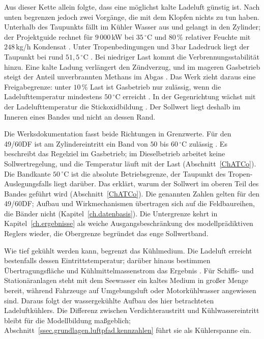 Aus dieser Kette allein folgte, dass eine möglichst kalte Ladeluft
günstig ist. Nach unten begrenzen jedoch zwei Vorgänge, die mit dem
Klopfen nichts zu tun haben. Unterhalb des Taupunkts fällt im Kühler
Wasser aus und gelangt in den Zylinder; der Projektguide rechnet für
$9\,000\,$kW bei $35\,^\circ$C und $80\,\%$ relativer Feuchte mit
$248\,$kg/h Kondensat
\cite[S.~333--334]{everllencese4960DFProject2026}. Unter
Tropenbedingungen und $3\,$bar Ladedruck liegt der Taupunkt bei rund
$51{,}5\,^\circ$C
\cite[S.~266\,f.]{pucherLadeluftkuehlungUndLadeluftkuehler2012}. Bei
niedriger Last kommt die Verbrennungsstabilität hinzu. Eine kalte Ladung
verlängert den Zündverzug, und im mageren Gasbetrieb steigt der Anteil
unverbrannten Methans im Abgas
\cite[S.~811--850]{almbauerThermomanagement2019}. Das Werk zieht daraus
eine Freigabegrenze: unter $10\,\%$ Last ist Gasbetrieb nur zulässig,
wenn die Ladelufttemperatur mindestens $50\,^\circ$C erreicht
\cite[S.~79]{everllencese4960DFProject2026}. In der Gegenrichtung wächst
mit der Ladelufttemperatur die Stickoxidbildung
\cite[S.~277]{merkerGrundlagenVerbrennungsmotorenSimulation2009}. Der
Sollwert liegt deshalb im Inneren eines Bandes und nicht an dessen Rand.

Die Werksdokumentation fasst beide Richtungen in Grenzwerte.
Für den 49/60DF ist am Zylindereintritt ein Band von $50$ bis
$60\,^\circ$C zulässig \cite[S.~162]{everllencese4960DFProject2026}.
Es beschreibt das Regelziel im Gasbetrieb; im Dieselbetrieb arbeitet
keine Sollwertregelung, und die Temperatur läuft mit der Last
(Abschnitt~\ref{ChATCo}). Die Bandkante $50\,^\circ$C ist die absolute
Betriebsgrenze, der Taupunkt des Tropen-Auslegungsfalls liegt darüber.
Das erklärt, warum der Sollwert im oberen Teil des Bandes geführt wird
(Abschnitt~\ref{ChATCo}). Die genannten Zahlen gelten für den 49/60DF;
Aufbau und Wirkmechanismen übertragen sich auf die Feldbaureihen, die
Bänder nicht (Kapitel~\ref{ch.datenbasis}). Die Untergrenze
kehrt in Kapitel~\ref{ch.ergebnisse} als weiche Ausgangsbeschränkung des
modellprädiktiven Reglers wieder, die Obergrenze begründet das enge
Sollwertband.


Wie tief gekühlt werden kann, begrenzt das Kühlmedium. Die Ladeluft
erreicht bestenfalls dessen Eintrittstemperatur; darüber hinaus
bestimmen Übertragungsfläche und Kühlmittelmassenstrom das Ergebnis
\cite[S.~360]{merkerGrundlagenVerbrennungsmotorenSimulation2009}. Für
Schiffs- und Stationäranlagen steht mit dem Seewasser ein kaltes Medium
in großer Menge bereit, während Fahrzeuge auf Umgebungsluft oder
Motorkühlwasser angewiesen sind. Daraus folgt der wassergekühlte Aufbau
des hier betrachteten Ladeluftkühlers. Die Differenz zwischen
Verdichteraustritt und Kühlwassereintritt bleibt für die Modellbildung
maßgeblich; Abschnitt~\ref{ssec.grundlagen.luftpfad.kennzahlen} führt
sie als Kühlerspanne ein.

